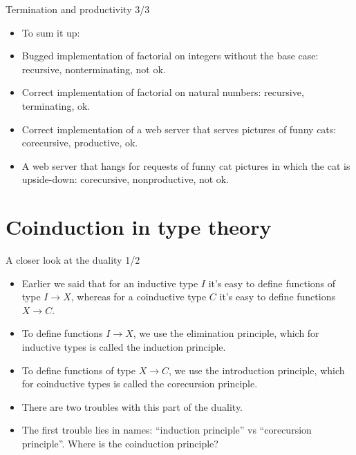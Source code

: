 \documentclass{beamer}
\begin{document}
\begin{frame}{Termination and productivity 3/3}
\begin{itemize}
	\item To sum it up:
	\item Bugged implementation of factorial on integers without the base case: recursive, nonterminating, not ok.
	\item Correct implementation of factorial on natural numbers: recursive, terminating, ok.
	\item Correct implementation of a web server that serves pictures of funny cats: corecursive, productive, ok.
	\item A web server that hangs for requests of funny cat pictures in which the cat is upside-down: corecursive, nonproductive, not ok.
\end{itemize}
\end{frame}

\section{Coinduction in type theory}

\begin{frame}{A closer look at the duality 1/2}
\begin{itemize}
	\item Earlier we said that for an inductive type $I$ it's easy to define functions of type $I \to X$, whereas for a coinductive type $C$ it's easy to define functions $X \to C$.
	\item To define functions $I \to X$, we use the elimination principle, which for inductive types is called the induction principle.
	\item To define functions of type $X \to C$, we use the introduction principle, which for coinductive types is called the corecursion principle.
	\item There are two troubles with this part of the duality.
  \item The first trouble lies in names: ``induction principle'' vs ``corecursion principle''. Where is the coinduction principle?
\end{itemize}
\end{frame}
\end{document}
